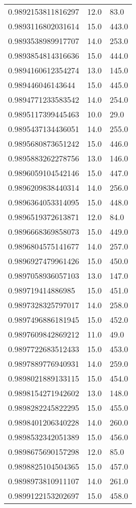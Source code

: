 \begin{center}
\begin{supertabular}[H]{p{0.30\textwidth}p{0.05\textwidth}p{0.05\textwidth}}
0.9892153811816297 & 12.0 & 83.0 \\ 
0.9893116802031614 & 15.0 & 443.0 \\ 
0.9893538989917707 & 14.0 & 253.0 \\ 
0.9893854814316636 & 15.0 & 444.0 \\ 
0.9894160612354274 & 13.0 & 145.0 \\ 
0.989446046143644 & 15.0 & 445.0 \\ 
0.9894771233583542 & 14.0 & 254.0 \\ 
0.9895117399445463 & 10.0 & 29.0 \\ 
0.9895437134436051 & 14.0 & 255.0 \\ 
0.9895680873651242 & 15.0 & 446.0 \\ 
0.9895883262278756 & 13.0 & 146.0 \\ 
0.9896059104542146 & 15.0 & 447.0 \\ 
0.9896209838440314 & 14.0 & 256.0 \\ 
0.9896364053314095 & 15.0 & 448.0 \\ 
0.9896519372613871 & 12.0 & 84.0 \\ 
0.9896668369858073 & 15.0 & 449.0 \\ 
0.9896804575141677 & 14.0 & 257.0 \\ 
0.9896927479961426 & 15.0 & 450.0 \\ 
0.9897058936057103 & 13.0 & 147.0 \\ 
0.989719414886985 & 15.0 & 451.0 \\ 
0.9897328325797017 & 14.0 & 258.0 \\ 
0.9897496886181945 & 15.0 & 452.0 \\ 
0.9897609842869212 & 11.0 & 49.0 \\ 
0.9897722683512433 & 15.0 & 453.0 \\ 
0.9897889776940931 & 14.0 & 259.0 \\ 
0.9898021889133115 & 15.0 & 454.0 \\ 
0.9898154271942602 & 13.0 & 148.0 \\ 
0.9898282245822295 & 15.0 & 455.0 \\ 
0.9898401206340228 & 14.0 & 260.0 \\ 
0.9898532342051389 & 15.0 & 456.0 \\ 
0.9898675690157298 & 12.0 & 85.0 \\ 
0.9898825104504365 & 15.0 & 457.0 \\ 
0.9898973810911107 & 14.0 & 261.0 \\ 
0.9899122153202697 & 15.0 & 458.0 \\ 

\end{supertabular}
\end{center}
